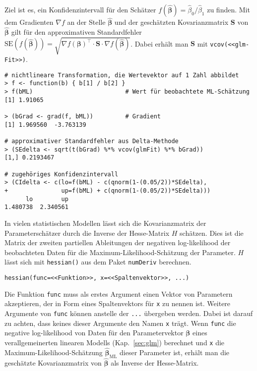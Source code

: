 Ziel ist es, ein Konfidenzintervall für den Schätzer $f(\hat{\bm{\beta}}) = \hat{\beta}_{0} / \hat{\beta}_{1}$ zu finden. Mit dem Gradienten $\nabla f$ an der Stelle $\hat{\bm{\beta}}$ und der geschätzten Kovarianzmatrix $\bm{S}$ von $\hat{\bm{\beta}}$ gilt für den approximativen Standardfehler $\text{SE}(f(\hat{\bm{\beta}})) = \sqrt{\nabla f(\bm{\beta})^{\top} \cdot \bm{S} \cdot \nabla f(\hat{\bm{\beta}})}$. Dabei erhält man $\bm{S}$ mit \lstinline!vcov(<<glm-Fit>>)!.
\begin{lstlisting}
# nichtlineare Transformation, die Wertevektor auf 1 Zahl abbildet
> f <- function(b) { b[1] / b[2] }
> f(bML)                          # Wert für beobachtete ML-Schätzung
[1] 1.91065

> (bGrad <- grad(f, bML))         # Gradient
[1] 1.969560  -3.763139

# approximativer Standardfehler aus Delta-Methode
> (SEdelta <- sqrt(t(bGrad) %*% vcov(glmFit) %*% bGrad))
[1,] 0.2193467

# zugehöriges Konfidenzintervall
> (CIdelta <- c(lo=f(bML) - c(qnorm(1-(0.05/2))*SEdelta),
+               up=f(bML) + c(qnorm(1-(0.05/2))*SEdelta)))
      lo        up 
1.480738  2.340561
\end{lstlisting}

In vielen statistischen Modellen lässt sich die Kovarianzmatrix der Parameterschätzer durch die Inverse der Hesse-Matrix $H$ schätzen. Dies ist die Matrix der zweiten partiellen Ableitungen der negativen log-likelihood der beobachteten Daten für die Maximum-Likelihood-Schätzung der Parameter. $H$ lässt sich mit \lstinline!hessian()! aus dem Paket \lstinline!numDeriv! berechnen.
\begin{lstlisting}
hessian(func=<<Funktion>>, x=<<Spaltenvektor>>, ...)
\end{lstlisting}

Die Funktion \lstinline!func! muss als erstes Argument einen Vektor von Parametern akzeptieren, der in Form eines Spaltenvektors für \lstinline!x! zu nennen ist. Weitere Argumente von \lstinline!func! können anstelle der \lstinline!...! übergeben werden. Dabei ist darauf zu achten, dass keines dieser Argumente den Namen \lstinline!x! trägt. Wenn \lstinline!func! die negative log-likelihood von Daten für den Parametervektor $\bm{\beta}$ eines verallgemeinerten linearen Modells (Kap.\ \ref{sec:glm}) berechnet und \lstinline!x! die Maximum-Likelihood-Schätzung $\hat{\bm{\beta}}_{\text{ML}}$ dieser Parameter ist, erhält man die geschätzte Kovarianzmatrix von $\hat{\bm{\beta}}$ als Inverse der Hesse-Matrix.

